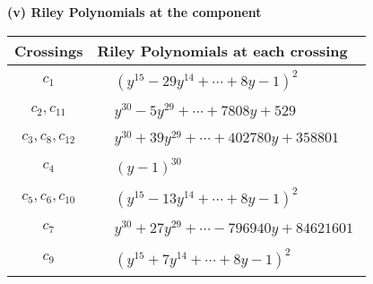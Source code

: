 \documentclass[1p]{elsarticle_modified}
\theoremstyle{definition}
\begin{document}
\newpage\renewcommand{\arraystretch}{1}
\flushleft \textbf{(v) Riley Polynomials at the component}\newline \\
\begin{tabular}{m{50pt}|m{274pt}}
Crossings & \hspace{64pt}Riley Polynomials at each crossing \\
\hline $$\begin{aligned}c_{1}\end{aligned}$$&$\begin{aligned}
&(y^{15}-29 y^{14}+\cdots+8 y-1)^{2}
\end{aligned}$\\
\hline $$\begin{aligned}c_{2},c_{11}\end{aligned}$$&$\begin{aligned}
&y^{30}-5 y^{29}+\cdots+7808 y+529
\end{aligned}$\\
\hline $$\begin{aligned}c_{3},c_{8},c_{12}\end{aligned}$$&$\begin{aligned}
&y^{30}+39 y^{29}+\cdots+402780 y+358801
\end{aligned}$\\
\hline $$\begin{aligned}c_{4}\end{aligned}$$&$\begin{aligned}
&(y-1)^{30}
\end{aligned}$\\
\hline $$\begin{aligned}c_{5},c_{6},c_{10}\end{aligned}$$&$\begin{aligned}
&(y^{15}-13 y^{14}+\cdots+8 y-1)^{2}
\end{aligned}$\\
\hline $$\begin{aligned}c_{7}\end{aligned}$$&$\begin{aligned}
&y^{30}+27 y^{29}+\cdots-796940 y+84621601
\end{aligned}$\\
\hline $$\begin{aligned}c_{9}\end{aligned}$$&$\begin{aligned}
&(y^{15}+7 y^{14}+\cdots+8 y-1)^{2}
\end{aligned}$\\
\hline
\end{tabular}\\~\\
\end{document}
